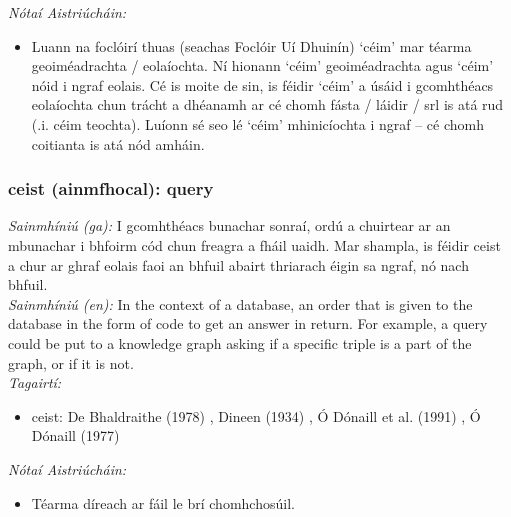\documentclass{article}
\begin{document}
 \noindent \textit{Nótaí Aistriúcháin:}
\begin{itemize}
	\item Luann na foclóirí thuas (seachas Foclóir Uí Dhuinín) `céim' mar téarma geoiméadrachta / eolaíochta. Ní hionann `céim' geoiméadrachta agus `céim' nóid i ngraf eolais. Cé is moite de sin, is féidir `céim' a úsáid i gcomhthéacs eolaíochta chun trácht a dhéanamh ar cé chomh fásta / láidir / srl is atá rud (.i. céim teochta). Luíonn sé seo lé `céim' mhinicíochta i ngraf -- cé chomh coitianta is atá nód amháin.
\end{itemize}


\subsubsection*{ceist (ainmfhocal): query}
 \noindent \textit{Sainmhíniú (ga):} I gcomhthéacs bunachar sonraí, ordú a chuirtear ar an mbunachar i bhfoirm cód chun freagra a fháil uaidh. Mar shampla, is féidir ceist a chur ar ghraf eolais faoi an bhfuil abairt thriarach éigin sa ngraf, nó nach bhfuil.
\\
 \noindent \textit{Sainmhíniú (en):} In the context of a database, an order that is given to the database in the form of code to get an answer in return. For example, a query could be put to a knowledge graph asking if a specific triple is a part of the graph, or if it is not.
\\
 \noindent \textit{Tagairtí:}
\begin{itemize}
	\item ceist: De Bhaldraithe (1978) \cite{de-bhaldraithe}, Dineen (1934) \cite{dineen}, Ó Dónaill et al. (1991) \cite{focloir-beag}, Ó Dónaill (1977) \cite{odonaill}
\end{itemize}

 \noindent \textit{Nótaí Aistriúcháin:}
\begin{itemize}
	\item Téarma díreach ar fáil le brí chomhchosúil.
\end{itemize}
\end{document}
